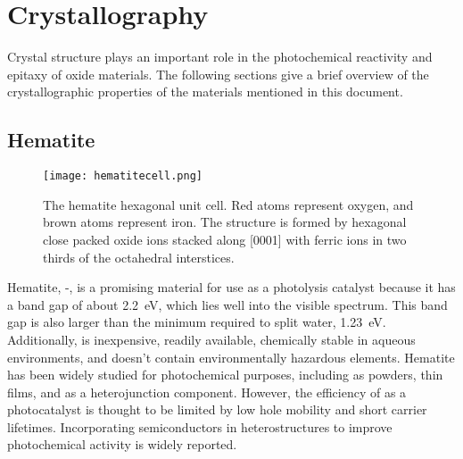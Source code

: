 \section{Crystallography}
\label{sec:background.crystallography}


Crystal structure plays an important role in the photochemical reactivity and epitaxy of oxide materials. The following sections give a brief overview of the crystallographic properties of the materials mentioned in this document.

\subsection{Hematite}
\label{subsec:background.hematite}

\begin{figure}
\centering
\texttt{[image: hematitecell.png]}
\caption[Hexagonal hematite unit cell]{%
	The hematite hexagonal unit cell. Red atoms represent oxygen, and brown atoms represent iron.  The structure is formed by hexagonal close packed oxide ions stacked along [0001] with ferric ions in two thirds of the octahedral interstices.}
\label{fig:hematitecell}

\end{figure}

Hematite, \textalpha-, is a promising material for use as a photolysis catalyst because it has a band gap of about 2.2~eV, which lies well into the visible spectrum.\cite{Lin:2011kw} This band gap is also larger than the minimum required to split water, 1.23~eV. Additionally,  is inexpensive, readily available, chemically stable in aqueous environments, and doesn't contain environmentally hazardous elements. Hematite has been widely studied for photochemical purposes,\cite{Sivula:2011cc} including as powders,\cite{GONDAL:2004df} thin films,\cite{Cao:2010dm} and as a heterojunction component.\cite{Luo:2006kg,Wang:2007fp} However, the efficiency of  as a photocatalyst is thought to be limited by low hole mobility and short carrier lifetimes.\cite{Sivula:2011cc} Incorporating semiconductors in heterostructures to improve photochemical activity is widely reported.\cite{Maruska:1979tr} 

